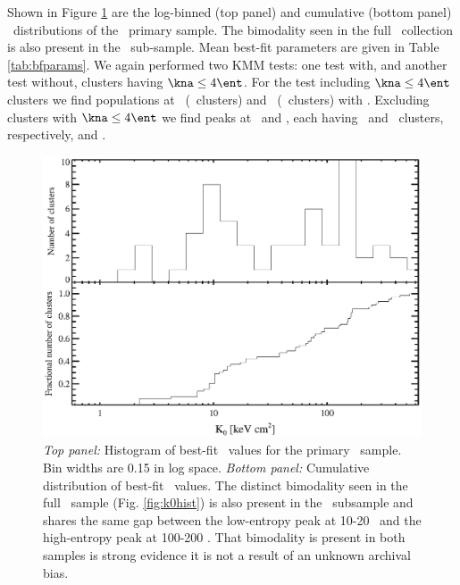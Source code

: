 Shown in Figure \ref{fig:hiflk0} are the log-binned (top panel) and
cumulative (bottom panel) \kna\ distributions of the \hifl\ primary
sample. The bimodality seen in the full \accept\ collection is also
present in the \hifl\ sub-sample. Mean best-fit parameters are given
in Table \ref{tab:bfparams}. We again performed two KMM tests: one
test with, and another test without, clusters having $\kna \le 4
\ent$. For the test including $\kna \le 4 \ent$ clusters we find
populations at \hiflkmma\ (\hiflkmmc\ clusters) and
\hiflkmmb\ (\hiflkmmd\ clusters) with \hiflkmme. Excluding clusters
with $\kna \le 4 \ent$ we find peaks at \hiflkmmf\ and \hiflkmmg, each
having \hiflkmmh\ and \hiflkmmi\ clusters, respectively, and
\hiflkmmj.

\begin{figure}[htp]
  \begin{center}
    \begin{minipage}[htp]{0.9\linewidth}
      \includegraphics*[width=\textwidth, trim=20mm 10mm 10mm 10mm, clip]{hifl_k0hist.eps}
      \caption[Histogram of best-fit \kna\ values
        for the primary \hifl\ sample.]{{\it{Top panel:}} Histogram of best-fit \kna\ values
        for the primary \hifl\ sample. Bin widths are 0.15 in log
        space.  {\it{Bottom panel:}} Cumulative distribution of
        best-fit \kna\ values. The distinct bimodality seen in the
        full \accept\ sample (Fig. \ref{fig:k0hist}) is also present
        in the \hifl\ subsample and shares the same gap between the
        low-entropy peak at 10-20 \ent\ and the high-entropy peak at
        100-200 \ent. That bimodality is present in both samples is
        strong evidence it is not a result of an unknown archival
        bias.}
      \label{fig:hiflk0}
    \end{minipage}
  \end{center}
\end{figure}

